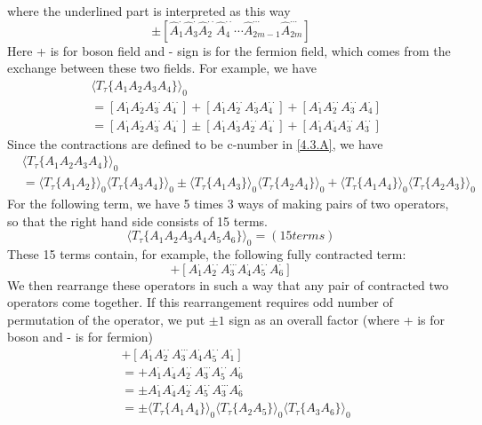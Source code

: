 where the underlined part is interpreted as this way
$$
\pm\left[\hat{A}_1^{\cdot} \hat{A}_3^{\cdot} \hat{A}_2^{\cdot\cdot} \hat{A}_4^{\cdot\cdot} \cdots \hat{A}_{2m-1}^{\cdots} \hat{A}_{2m}^{\cdots}\right]
$$
Here + is for boson field and - sign is for the fermion field, which comes from the exchange between these two fields.
For example, we have
$$
\begin{aligned}
&\langle T_\tau\{A_1A_2A_3A_4\}\rangle_0\\
&=\left[A_1^\cdot A_2^\cdot A_3^{\cdot\cdot} A_4^{\cdot\cdot}\right] + \left[A_1^\cdot A_2^{\cdot\cdot} A_3^\cdot A_4^{\cdot\cdot}\right] +
\left[A_1^\cdot A_2^{\cdot\cdot} A_3^{\cdot\cdot} A_4^\cdot\right]\\
&=\left[A_1^\cdot A_2^\cdot A_3^{\cdot\cdot} A_4^{\cdot\cdot}\right]\pm\left[A_1^\cdot A_3^\cdot A_2^{\cdot\cdot} A_4^{\cdot\cdot}\right]
+\left[A_1^\cdot A_4^\cdot A_3^{\cdot\cdot} A_3^{\cdot\cdot}\right]
\end{aligned}
$$
Since the contractions are defined to be c-number in \ref{4.3.A}, we have
$$
\begin{aligned}
&\langle T_\tau\{A_1A_2A_3A_4\}\rangle_0\\
&=\langle T_\tau\{A_1A_2\}\rangle_0\langle T_\tau\{A_3A_4\}\rangle_0\pm\langle T_\tau\{A_1A_3\}\rangle_0\langle T_\tau\{A_2A_4\}\rangle_0
+\langle T_\tau\{A_1A_4\}\rangle_0\langle T_\tau\{A_2A_3\}\rangle_0
\end{aligned}
$$
For the following term, we have 5 times 3 ways of making pairs of two operators, so that the right hand side consists of 15 terms.
$$
\langle T_\tau\{A_1A_2A_3A_4A_5A_6\}\rangle_0=(15 terms)
$$
These 15 terms contain, for example, the following fully contracted term:
$$
+\left[A_1^{\cdot}A_2^{\cdot\cdot}A_3^{\cdots}A_4^{\cdot}A_5^{\cdot\cdot}A_6^{\cdot}\right]
$$
We then rearrange these operators in such a way that any pair of contracted two operators come together.
If this rearrangement requires odd number of permutation of the operator, we put $\pm1$ sign as an overall factor (where + is for boson and - is for fermion)
$$
\begin{aligned}
&+\left[A_1^{\cdot}A_2^{\cdot\cdot}A_3^{\cdots}A_4^{\cdot}A_5^{\cdot\cdot}A_1^{\cdot}\right]\\
&=+A_1^{\cdot}A_4^{\cdot}A_2^{\cdot\cdot}A_3^{\cdots}A_5^{\cdot\cdot}A_6^{\cdot}\\
&=\pm A_1^{\cdot}A_4^{\cdot}A_2^{\cdot\cdot}A_5^{\cdot\cdot}A_3^{\cdots}A_6^{\cdot}\\
&=\pm\langle T_\tau\{A_1A_4\}\rangle_0 \langle T_\tau \{A_2A_5\}\rangle_0 \langle T_\tau \{A_3A_6\}\rangle_0
\end{aligned}
$$
